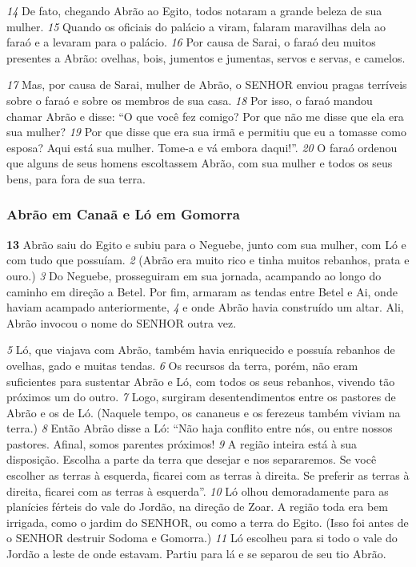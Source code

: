 \bigskip
\textit{\tiny 14}
De fato, chegando Abrão ao Egito, todos notaram a grande beleza de sua
mulher. 
\textit{\tiny 15}
Quando os oficiais do palácio a viram, falaram maravilhas dela ao faraó
e a levaram para o palácio. 
\textit{\tiny 16}
Por causa de Sarai, o faraó deu muitos presentes a
Abrão: ovelhas, bois, jumentos e jumentas, servos e servas, e camelos.

\bigskip
\textit{\tiny 17}
Mas, por causa de Sarai, mulher de Abrão, o SENHOR enviou pragas terríveis
sobre o faraó e sobre os membros de sua casa. 
\textit{\tiny 18}
Por isso, o faraó mandou chamar
Abrão e disse: “O que você fez comigo? Por que não me disse que ela era sua
mulher? 
\textit{\tiny 19}
Por que disse que era sua irmã e permitiu que eu a tomasse como
esposa? Aqui está sua mulher. Tome-a e vá embora daqui!”. 
\textit{\tiny 20}
O faraó ordenou
que alguns de seus homens escoltassem Abrão, com sua mulher e todos os seus
bens, para fora de sua terra.

\bigskip
\subsubsection*{Abrão em Canaã e Ló em Gomorra}
\textbf{\large 13}
 Abrão saiu do Egito e subiu para o Neguebe, junto com sua mulher, com Ló
e com tudo que possuíam. 
\textit{\tiny 2}
(Abrão era muito rico e tinha muitos rebanhos, prata e
ouro.) 
\textit{\tiny 3}
Do Neguebe, prosseguiram em sua jornada, acampando ao longo do
caminho em direção a Betel. Por fim, armaram as tendas entre Betel e Ai, onde
haviam acampado anteriormente, 
\textit{\tiny 4}
e onde Abrão havia construído um altar. Ali,
Abrão invocou o nome do SENHOR outra vez.

\bigskip
\textit{\tiny 5}
Ló, que viajava com Abrão, também havia enriquecido e possuía rebanhos de
ovelhas, gado e muitas tendas. 
\textit{\tiny 6}
Os recursos da terra, porém, não eram suficientes para sustentar Abrão e Ló, com todos os seus rebanhos, vivendo tão próximos um
do outro. 
\textit{\tiny 7}
Logo, surgiram desentendimentos entre os pastores de Abrão e os de
Ló. (Naquele tempo, os cananeus e os ferezeus também viviam na terra.)
\textit{\tiny 8}
Então Abrão disse a Ló: “Não haja conflito entre nós, ou entre nossos pastores.
Afinal, somos parentes próximos! 
\textit{\tiny 9}
A região inteira está à sua disposição. Escolha
a parte da terra que desejar e nos separaremos. Se você escolher as terras à
esquerda, ficarei com as terras à direita. Se preferir as terras à direita, ficarei com
as terras à esquerda”.
\textit{\tiny 10}
Ló olhou demoradamente para as planícies férteis do vale do Jordão, na
direção de Zoar. A região toda era bem irrigada, como o jardim do SENHOR, ou
como a terra do Egito. (Isso foi antes de o SENHOR destruir Sodoma e Gomorra.)
\textit{\tiny 11}
Ló escolheu para si todo o vale do Jordão a leste de onde estavam. Partiu para lá
e se separou de seu tio Abrão. 

